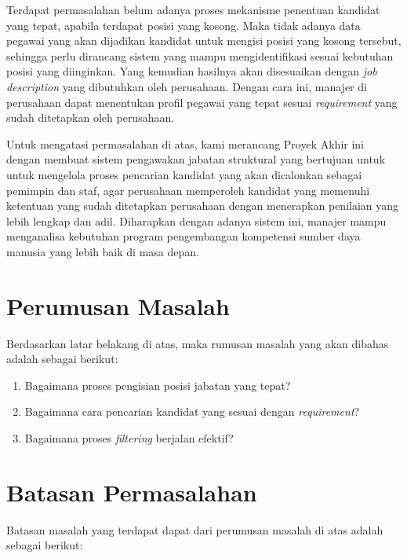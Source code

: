 Terdapat permasalahan belum adanya proses mekanisme penentuan kandidat yang tepat, apabila terdapat posisi yang kosong. Maka tidak adanya data pegawai yang akan dijadikan kandidat untuk mengisi posisi yang kosong tersebut, sehingga perlu dirancang sistem yang mampu mengidentifikasi sesuai kebutuhan posisi yang diinginkan. Yang kemudian hasilnya akan disesuaikan dengan \textit{job description} yang dibutuhkan oleh perusahaan. Dengan cara ini, manajer di perusahaan dapat menentukan profil pegawai yang tepat sesuai \textit{requirement} yang sudah ditetapkan oleh perusahaan.

Untuk mengatasi permasalahan di atas, kami merancang Proyek Akhir ini dengan membuat sistem pengawakan jabatan struktural yang bertujuan untuk untuk mengelola proses pencarian kandidat yang akan dicalonkan sebagai pemimpin dan staf, agar perusahaan memperoleh kandidat yang memenuhi ketentuan yang sudah ditetapkan perusahaan dengan menerapkan penilaian yang lebih lengkap dan adil. Diharapkan dengan adanya sistem ini, manajer mampu menganalisa kebutuhan program pengembangan kompetensi sumber daya manusia yang lebih baik di masa depan.


\section{Perumusan Masalah}
Berdasarkan latar belakang di atas, maka rumusan masalah yang akan dibahas adalah sebagai berikut:
\begin{enumerate}
\item Bagaimana proses pengisian posisi jabatan yang tepat?
\item Bagaimana cara pencarian kandidat yang sesuai dengan \textit{requirement}?
\item Bagaimana proses \textit{filtering} berjalan efektif?
\end{enumerate}

\section{Batasan Permasalahan}
Batasan masalah yang terdapat dapat dari perumusan masalah di atas adalah sebagai berikut:

